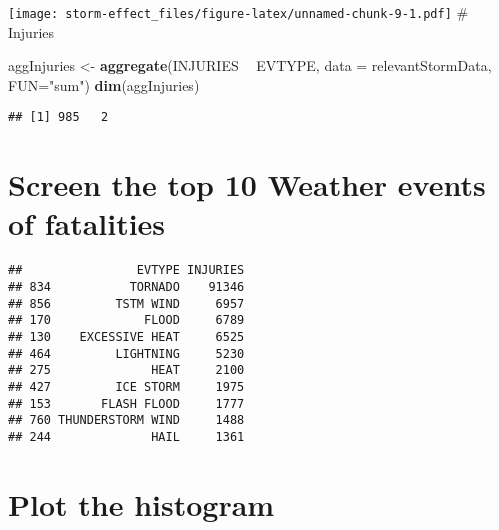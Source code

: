 \documentclass[
]{article}
\newenvironment{Shaded}{\begin{snugshade}}{\end{snugshade}}
\newcommand{\DataTypeTok}[1]{\textcolor[rgb]{0.13,0.29,0.53}{#1}}
\newcommand{\DecValTok}[1]{\textcolor[rgb]{0.00,0.00,0.81}{#1}}
\newcommand{\KeywordTok}[1]{\textcolor[rgb]{0.13,0.29,0.53}{\textbf{#1}}}
\newcommand{\NormalTok}[1]{#1}
\newcommand{\OperatorTok}[1]{\textcolor[rgb]{0.81,0.36,0.00}{\textbf{#1}}}
\newcommand{\StringTok}[1]{\textcolor[rgb]{0.31,0.60,0.02}{#1}}
\begin{document}
\texttt{[image: storm-effect\_files/figure-latex/unnamed-chunk-9-1.pdf]}
\# Injuries

\begin{Shaded}
\begin{Highlighting}[]
\NormalTok{aggInjuries <-}\StringTok{ }\KeywordTok{aggregate}\NormalTok{(INJURIES }\OperatorTok{~}\StringTok{ }\NormalTok{EVTYPE, }\DataTypeTok{data =}\NormalTok{ relevantStormData,  }\DataTypeTok{FUN=}\StringTok{"sum"}\NormalTok{)}
\KeywordTok{dim}\NormalTok{(aggInjuries) }
\end{Highlighting}
\end{Shaded}

\begin{verbatim}
## [1] 985   2
\end{verbatim}

\hypertarget{screen-the-top-10-weather-events-of-fatalities-1}{%
\section{Screen the top 10 Weather events of
fatalities}\label{screen-the-top-10-weather-events-of-fatalities-1}}

\begin{Shaded}
\end{Shaded}

\begin{verbatim}
##                EVTYPE INJURIES
## 834           TORNADO    91346
## 856         TSTM WIND     6957
## 170             FLOOD     6789
## 130    EXCESSIVE HEAT     6525
## 464         LIGHTNING     5230
## 275              HEAT     2100
## 427         ICE STORM     1975
## 153       FLASH FLOOD     1777
## 760 THUNDERSTORM WIND     1488
## 244              HAIL     1361
\end{verbatim}

\hypertarget{plot-the-histogram}{%
\section{Plot the histogram}\label{plot-the-histogram}}
\end{document}
